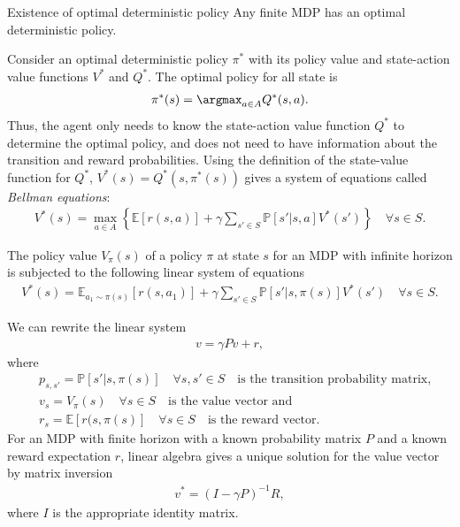 \begin{theorem}{Existence of optimal deterministic policy}
    Any finite MDP has an optimal deterministic policy.
\end{theorem}
Consider an optimal deterministic policy $\pi^{*}$ with its policy value and
state-action value functions $V^{*}$ and $Q^{*}$. The optimal policy for all
state is
\begin{align}
    \pi^{*}(s) = \argmax_{a \in A} Q^{*}(s,a).
\end{align}
Thus, the agent only needs to know the state-action value function $Q^{*}$ to
determine the optimal policy, and does not need to have information about the
transition and reward probabilities. Using the definition of the state-value
function for $Q^{*}$, $V^{*}(s) = Q^{*}(s, \pi^{*}(s))$ gives a system of
equations called \textit{Bellman equations}:
\begin{align}
    V^{*}(s) = \max_{a\in A} \left\{ \mathbb{E}[r(s, a)] + \gamma\sum_{s'\in S}
    \mathbb{P}[s'|s,a] V^{*}(s') \right\} \quad \forall s \in S.
\end{align}
\begin{theorem}
    The policy value $V_\pi(s)$ of a policy $\pi$ at state $s$ for an MDP
    with infinite horizon is subjected to the following linear system of
    equations
    \begin{align}
        V^{*}(s) = \mathbb{E}_{a_1 \sim \pi(s)}[r(s, a_1)] + \gamma\sum_{s'\in S}
        \mathbb{P}[s'|s, \pi(s)] V^{*}(s') \quad \forall s \in S.
    \end{align}
\end{theorem}
We can rewrite the linear system
\begin{align}
    v = \gamma P v + r,
\end{align}
where
\begin{align}
    &p_{s, s'} = \mathbb{P}[s'|s, \pi(s)] \quad \forall s,s' \in S \quad
    \text{is the transition probability matrix,}\\
    &v_s = V_\pi(s) \quad \forall s \in S \quad \text{is the value vector and }\\
    &r_s = \mathbb{E}[r(s, \pi(s)] \quad \forall s \in S \quad \text{is the reward
    vector}.
\end{align}
For an MDP with finite horizon with a known probability matrix $P$ and a
known reward expectation $r$, linear algebra gives a unique solution for
the value vector by matrix inversion
\begin{align}
    v^{*} = (I - \gamma P)^{-1} R,
\end{align}
where $I$ is the appropriate identity matrix.
\newline

